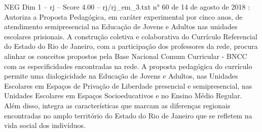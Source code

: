 \begin{textsample}{NEG Dim 1 – rj – Score 4.00 – rj/rj\_em\_3.txt}
n{\EmojiFont °} 60 de 14 de agosto de 2018 : Autoriza a Proposta Pedagógica, em caráter experimental por cinco anos, de atendimento semipresencial na Educação de Jovens e Adultos nas unidades escolares prisionais.
A construção coletiva e colaborativa do Currículo Referencial do Estado do Rio de Janeiro, com a participação dos professores da rede, procura alinhar os conceitos propostos pela Base Nacional Comum Curricular - BNCC com as especificidades encontradas na rede.
A proposta pedagógica do currículo permite uma dialogicidade na Educação de Jovens e Adultos, nas Unidades Escolares em Espaços de Privação de Liberdade presencial e semipresencial, nas Unidades Escolares em Espaços Socioeducativos e no Ensino Médio Regular.
Além disso, integra as características que marcam as diferenças regionais encontradas no amplo território do Estado do Rio de Janeiro que se refletem na vida social dos indivíduos.

\end{textsample}
